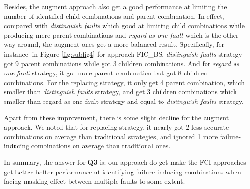 \documentclass{sig-alternate}
\begin{document}
Besides, the augment approach also get a good performance at limiting the number of identified child combinations and parent combination. In effect, compared with \emph{distinguish faults} which good at limiting child combinations while producing more parent combinations and \emph{regard as one fault} which is the other way around, the augment ones get a more balanced result. Specifically, for instance, in Figure \ref{fig:subfig4} for approach FIC\_BS, \emph{distinguish faults} strategy got 9 parent combinations while got 3 children combinations. And for \emph{regard as one fault} strategy, it got none parent combination but got 8 children combinations. For the replacing strategy, it only get 4 parent combination, which smaller than \emph{distinguish faults} strategy, and get 3 children combinations which smaller than regard as one fault strategy and equal to \emph{distinguish faults} strategy.

Apart from these improvement, there is some slight decline for the augment approach. We noted that for replacing strategy, it nearly got 2 less accurate combinations on average than traditional strategies, and ignored 1 more failure-inducing combinations on average than traditional ones.


In summary, the answer for \textbf{Q3} is: our approach do get make the FCI approaches get better better performance at identifying failure-inducing combinations when facing masking effect between multiple faults to some extent.
\end{document}
